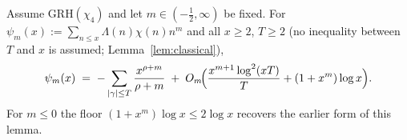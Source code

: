 
\begin{lemma}\label{lem:trunc}
Assume GRH$(\chi_4)$ and let $m\in(-\tfrac12,\infty)$ be fixed. For
$\psi_m(x):=\sum_{n\le x}\Lambda(n)\chi(n)n^m$ and all $x\ge2$,
$T\ge2$ (no inequality between $T$ and $x$ is assumed;
Lemma~\ref{lem:classical}),
\begin{equation}\label{eq:trunc}
\psi_m(x)\;=\;-\sum_{|\gamma|\le T}\frac{x^{\rho+m}}{\rho+m}
\;+\;O_m\!\Bigl(\frac{x^{m+1}\log^2(xT)}{T}+(1+x^m)\log x\Bigr).
\end{equation}
For $m\le0$ the floor $(1+x^m)\log x\le2\log x$ recovers the earlier
form of this lemma.
\end{lemma}

